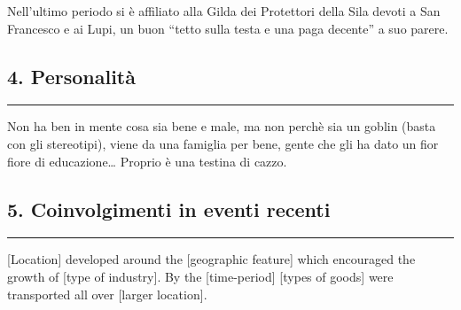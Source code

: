 Nell'ultimo periodo si è affiliato alla Gilda dei Protettori della Sila
devoti a San Francesco e ai Lupi, un buon ``tetto sulla testa e una paga
decente'' a suo parere.

\subsection{4. Personalità}\label{personalituxe0}

\begin{center}\rule{0.5\linewidth}{0.5pt}\end{center}

Non ha ben in mente cosa sia bene e male, ma non perchè sia un goblin
(basta con gli stereotipi), viene da una famiglia per bene, gente che
gli ha dato un fior fiore di educazione\ldots{} Proprio è una testina di
cazzo.

\subsection{5. Coinvolgimenti in eventi
recenti}\label{coinvolgimenti-in-eventi-recenti}

\begin{center}\rule{0.5\linewidth}{0.5pt}\end{center}

{[}Location{]} developed around the {[}geographic feature{]} which
encouraged the growth of {[}type of industry{]}. By the
{[}time-period{]} {[}types of goods{]} were transported all over
{[}larger location{]}.
